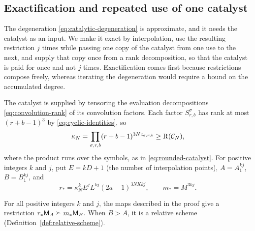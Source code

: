 \subsection{Exactification and repeated use of one catalyst}
\label{subsec:relative}

The degeneration \eqref{eq:catalytic-degeneration} is approximate, and it
needs the catalyst as an input. We make it exact by interpolation, use the
resulting restriction \(j\) times while passing one copy of the catalyst
from one use to the next, and supply that copy once from a rank
decomposition, so that the catalyst is paid for once and not \(j\) times.
Exactification comes first because restrictions compose
freely, whereas iterating the degeneration would require a bound on the
accumulated degree.

The catalyst is supplied by tensoring the evaluation decompositions
\eqref{eq:convolution-rank} of its convolution factors. Each factor
\(S^\sigma_{r,b}\) has rank at most \((r+b-1)^3\) by
\eqref{eq:cyclic-identities}, so
\begin{equation}\label{eq:kappa}
 \kappa_N=\prod_{\sigma,r,b}(r+b-1)^{3Nc_{\sigma,r,b}}
 \ge\operatorname{R}(\mathcal C_N),
\end{equation}
where the product runs over the symbols, as in \eqref{eq:rounded-catalyst}.
For positive integers \(k\) and \(j\), put \(E=kD+1\) (the number of
interpolation points), \(A=A_1^{kj}\), \(B=B_1^{kj}\), and
\begin{equation}\label{eq:relative-counts}
 r_*=\kappa_N^kE^jL^{kj}(2a-1)^{3NKkj},
 \qquad m_*=M^{3kj}.
\end{equation}

\begin{proposition}\label{prop:relative}
For all positive integers \(k\) and \(j\), the maps described in the proof
give a restriction \(r_*\mathsf M_A\succeq m_*\mathsf M_B\). When \(B>A\), it is a
relative scheme (Definition~\ref{def:relative-scheme}).
\end{proposition}

